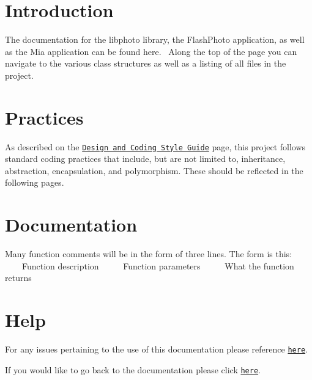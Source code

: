\section*{Introduction}

The documentation for the libphoto library, the Flash\+Photo application, as well as the Mia application can be found here.~\newline
 Along the top of the page you can navigate to the various class structures as well as a listing of all files in the project.

\section*{Practices}

As described on the \href{../../web/static/views/design.html}{\tt Design and Coding Style Guide} page, this project follows standard coding practices that include, but are not limited to, inheritance, abstraction, encapsulation, and polymorphism. These should be reflected in the following pages.~\newline


\section*{Documentation}

Many function comments will be in the form of three lines. The form is this\+: ~\newline
 ~~~~Function description~\newline
 ~~~~Function parameters~\newline
 ~~~~What the function returns

\section*{Help}

For any issues pertaining to the use of this documentation please reference \href{www.doxygen.org/}{\tt here}.

If you would like to go back to the documentation please click \href{../../web/index.html}{\tt here}. 